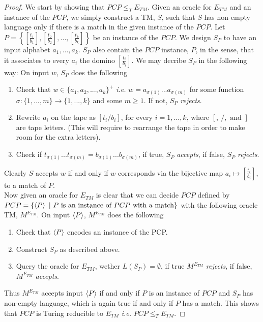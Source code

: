 \documentclass[a4paper,11pt]{article}
\newcommand{\ie}{\emph{i.e.} }
\numberwithin{equation}{section}
\begin{document}
\begin{proof}
	We start by showing that $ PCP\leq_T E_{TM} $. Given an oracle for $ E_{TM} $ and an instance of the $ PCP $, we simply construct a TM, $ S $, such that $ S $ has non-empty language only if there is a match in the given instance of the $ PCP $. Let $ P= \left\{\left[\frac{t_1}{b_1}\right],\left[\frac{t_2}{b_2}\right],...,\left[\frac{t_k}{b_k}\right]\right\} $ be an instance of the $ PCP $. We design $ S_P $ to have an input alphabet $ a_1,...,a_k $. $ S_P $ also contain the $ PCP $ instance, $ P $, in the sense, that it associates to every $ a_i $ the domino $ \left[\frac{t_i}{b_i}\right] $. We may decribe $ S_P $ in the following way: On input $ w $, $ S_P $ does the following \begin{enumerate}
		\item Check that $ w\in \{a_1,a_2,...,a_k\}^+ $ \ie $ w=a_{\sigma(1)}...a_{\sigma(m)} $ for some function $ \sigma:\{1,...,m\} \to\{1,...,k\} $ and some $ m\geq 1 $. If not, $ S_P $ \emph{rejects}.
		\item Rewrite $ a_i $ on the tape as $ \left[t_i/b_i\right] $, for every $ i=1,...,k $, where $ [,\ /,\text{ and } ] $ are tape letters. (This will require to rearrange the tape in order to make room for the extra letters).
		\item Check if $ t_{\sigma(1)}...t_{\sigma(m)}=b_{\sigma(1)}...b_{\sigma(m)} $, if true, $ S_P $ \emph{accepts}, if false, $ S_P $ \emph{rejects}.
	\end{enumerate}
Clearly $ S $ accepts $ w $ if and only if $ w $ corresponds via the bijective map $ a_i\mapsto \left[\frac{t_i}{b_i}\right] $, to a match of $ P $.\\
Now given an oracle for $ E_{TM} $ is clear that we can decide $ PCP $ defined by\\ $ PCP=\{\braket{P} \ \vert\  P\text{ is an instance of }PCP\text{ with a match}\} $ with the following oracle TM, $ M^{E_{TM}} $.
On input $ \braket{P} $, $ M^{E_{TM}} $ does the following \begin{enumerate}
	\item Check that $ \braket{P} $ encodes an instance of the PCP.
	\item Construct $ S_P $ as described above.
	\item Query the oracle for $ E_{TM} $, wether $ L(S_P)=\emptyset $, if true $ M^{E_{TM}} $ \emph{rejects}, if false, $ M^{E_{TM}} $ \emph{accepts}.
\end{enumerate} 
Thus $ M^{E_{TM}} $ accepts input $ \braket{P} $ if and only if $ P $ is an instance of $ PCP $ and $ S_P $ has non-empty language, which is again true if and only if $ P $ has a match. This shows that $ PCP $ is Turing reducible to $ E_{TM} $ \ie $ PCP\leq_T E_{TM} $. 

\end{proof}
\end{document}

